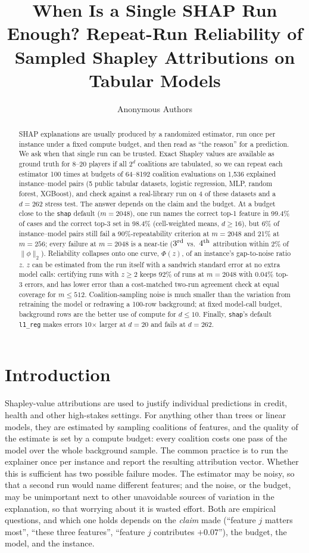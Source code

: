 \documentclass{article}
\title{When Is a Single SHAP Run Enough? Repeat-Run Reliability of Sampled Shapley Attributions on Tabular Models}
\author{Anonymous Authors}
\begin{document}
\maketitle

\begin{abstract}
SHAP explanations are usually produced by a randomized estimator, run once per instance under a fixed compute budget, and then read as ``the reason'' for a prediction. We ask when that single run can be trusted. Exact Shapley values are available as ground truth for 8--20 players if all $2^d$ coalitions are tabulated, so we can repeat each estimator 100 times at budgets of 64--8192 coalition evaluations on 1{,}536 explained instance--model pairs (5 public tabular datasets, logistic regression, MLP, random forest, XGBoost), and check against a real-library run on 4 of these datasets and a $d{=}262$ stress test. The answer depends on the claim and the budget. At a budget close to the \texttt{shap} default ($m{=}2048$), one run names the correct top-1 feature in 99.4\% of cases and the correct top-3 set in 98.4\% (cell-weighted means, $d\ge16$), but 6\% of instance--model pairs still fail a 90\%-repeatability criterion at $m{=}2048$ and 21\% at $m{=}256$; every failure at $m{=}2048$ is a near-tie ($3^{\rm rd}$ vs.\ $4^{\rm th}$ attribution within 2\% of $\|\phi\|_2$). Reliability collapses onto one curve, $\Phi(z)$, of an instance's gap-to-noise ratio $z$. $z$ can be estimated from the run itself with a sandwich standard error at no extra model calls: certifying runs with $z\ge2$ keeps 92\% of runs at $m{=}2048$ with 0.04\% top-3 errors, and has lower error than a cost-matched two-run agreement check at equal coverage for $m\le512$. Coalition-sampling noise is much smaller than the variation from retraining the model or redrawing a 100-row background; at fixed model-call budget, background rows are the better use of compute for $d\le10$. Finally, \texttt{shap}'s default \texttt{l1\_reg} makes errors 10$\times$ larger at $d{=}20$ and fails at $d{=}262$.
\end{abstract}

\section{Introduction}
Shapley-value attributions \citep{lundberg2017} are used to justify individual predictions in credit, health and other high-stakes settings. For anything other than trees or linear models, they are estimated by sampling coalitions of features, and the quality of the estimate is set by a compute budget: every coalition costs one pass of the model over the whole background sample. The common practice is to run the explainer once per instance and report the resulting attribution vector. Whether this is sufficient has two possible failure modes. The estimator may be noisy, so that a second run would name different features; and the noise, or the budget, may be unimportant next to other unavoidable sources of variation in the explanation, so that worrying about it is wasted effort. Both are empirical questions, and which one holds depends on the \emph{claim} made (``feature $j$ matters most'', ``these three features'', ``feature $j$ contributes $+0.07$''), the budget, the model, and the instance.
\end{document}
